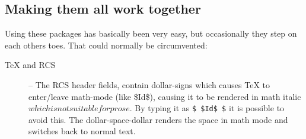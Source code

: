 \subsection{Making them all work together}
\label{sec:making-them-all-work-together}

Using these packages has basically been very easy, but occasionally
they step on each others toes.  That could normally be circumvented:

\begin{description}
\item[{\TeX} and RCS] -- The RCS header fields, contain dollar-signs
  which causes {\TeX} to enter/leave math-mode (like
  \mbox{\$I}\mbox{d\$}), causing it to be rendered in math italic
  $which is not suitable for prose$.  By typing it as \texttt{\$
    \${}Id\$ \$} it is possible to avoid this. The dollar-space-dollar
  renders the space in math mode and switches back to normal text.
\end{description}

